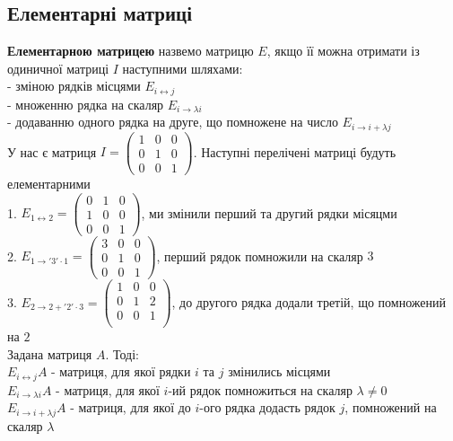 \documentclass[a4paper, 10pt]{article}
\theoremstyle{theoremdd}
\begin{document}
	\subsection{Елементарні матриці}
	 \textbf{Елементарною матрицею} назвемо матрицю $E$, якщо її можна отримати із одиничної матриці $I$ наступними шляхами:\\
	- зміною рядків місцями $E_{i \leftrightarrow j}$\\
	- множенню рядка на скаляр $E_{i \rightarrow \lambda i}$\\
	- додаванню одного рядка на друге, що помножене на число $E_{i \rightarrow i + \lambda j}$
	\bigskip \\
	 У нас є матриця $I = \begin{pmatrix}
	1 & 0 & 0 \\
	0 & 1 & 0 \\
	0 & 0 & 1
	\end{pmatrix}$. Наступні перелічені матриці будуть елементарними\\
	1. $E_{1 \leftrightarrow 2} = \begin{pmatrix}
	0 & 1 & 0 \\
	1 & 0 & 0 \\
	0 & 0 & 1 
	\end{pmatrix}$, ми змінили перший та другий рядки місяцми\\
	2. $E_{1 \rightarrow '3' \cdot 1} = \begin{pmatrix}
	3 & 0 & 0 \\
	0 & 1 & 0 \\
	0 & 0 & 1
	\end{pmatrix}$, перший рядок помножили на скаляр $3$\\
	3. $E_{2 \rightarrow 2 + '2'\cdot 3} = \begin{pmatrix}
	1 & 0 & 0 \\
	0 & 1 & 2 \\
	0 & 0 & 1 \\
	\end{pmatrix}$, до другого рядка додали третій, що помножений на $2$
	\bigskip \\
	 Задана матриця $A$. Тоді:\\
	$E_{i \leftrightarrow j}A$ - матриця, для якої рядки $i$ та $j$ змінились місцями\\
	$E_{i \rightarrow \lambda i}A$ - матриця, для якої $i$-ий рядок помножиться на скаляр $\lambda \neq 0$\\
	$E_{i \rightarrow i + \lambda j}A$ - матриця, для якої до $i$-ого рядка додасть рядок $j$, помножений на скаляр $\lambda$\\
\end{document}
